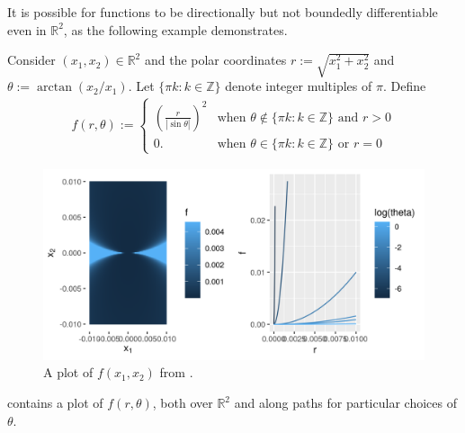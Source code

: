 It is possible for functions to be directionally but not boundedly
differentiable even in $\mathbb{R}^2$, as the following example demonstrates.

\begin{ex}
%
Consider $(x_1, x_2) \in \mathbb{R}^2$ and the polar coordinates $r :=
\sqrt{x_1^2 + x_2^2}$ and $\theta := \arctan(x_2 / x_1)$.  Let $\{\pi k: k \in
\mathbb{Z} \}$ denote integer multiples of $\pi$.  Define
%
\begin{align*}
%
f(r, \theta) := \begin{cases}
    \left(\frac{r}{| \sin \theta |}\right)^2
        & \textrm{when } \theta \notin \{\pi k: k \in \mathbb{Z}\}
        \textrm{ and } r > 0 \\
    0. & \textrm{when } \theta \in \{\pi k: k \in \mathbb{Z}
        \} \textrm{ or }r = 0
%
\end{cases}
%
\end{align*}
%
\begin{figure}[h!]

\includegraphics[width=0.980\linewidth,height=0.490\linewidth]{static_images/pathological_r2_example.png}
\caption{A plot of $f(x_1, x_2)$ from .}
\centering
\end{figure}
%
 contains a plot of $f(r, \theta)$, both over
$\mathbb{R}^2$ and along paths for particular choices of $\theta$.


\end{ex}

